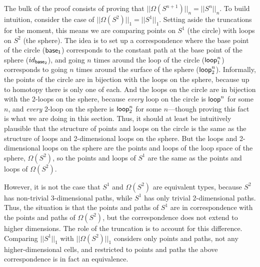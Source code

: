 The bulk of the proof consists of proving that $||\Omega(S^{n+1})||_n =
||S^{n}||_n$.  To build intuition, consider the case of
$||\Omega(S^2)||_1 = ||S^1||_1$.  Setting aside the truncations for the
moment, this means we are comparing points on $S^1$ (the circle) with loops on
$S^2$ (the sphere).  The idea is to set up a correspondence where the
base point of the circle ($\mathsf{base_1}$) corresponds to the constant
path at the base point of the sphere ($id_{\mathsf{base}_2}$), and going
$n$ times around the loop of the circle ($\mathsf{loop}_1^n$) corresponds
to going $n$ times around the surface of the sphere ($\mathsf{loop}_2^n$).
Informally, the points of the circle are in bijection with the loops on
the sphere, because up to homotopy there is only one of each.  And the
loops on the circle are in bijection with the 2-loops on the sphere,
because \emph{every} loop on the circle is $\mathsf{loop}^n$ for some $n$,
and \emph{every} 2-loop on the sphere is $\mathsf{loop}_2^n$ for some
$n$---though proving this fact is what we are doing in this section.
Thus, it should at least be intuitively plausible that the structure of
points and loops on the circle is the same as the structure of loops and
2-dimensional loops on the sphere.  But the loops and 2-dimensional
loops on the sphere are the points and loops of the loop space of the
sphere, $\Omega(S^2)$, so the points and loops of $S^1$ are the same as
the points and loops of $\Omega(S^2)$.

However, it is not the case that $S^1$ and $\Omega(S^2)$ are equivalent
types, because $S^2$ has non-trivial 3-dimensional paths, while $S^1$
has only trivial 2-dimensional paths.  Thus, the situation is that the
points and paths of $S^1$ are in correspondence with the points and
paths of $\Omega(S^2)$, but the correspondence does not extend to higher
dimensions.  The role of the truncation is to account for this
difference.  Comparing $||S^1||_1$ with $||\Omega(S^2)||_1$ considers
only points and paths, not any higher-dimensional cells, and restricted
to points and paths the above correspondence is in fact an equivalence.

